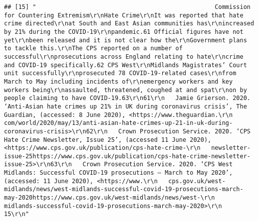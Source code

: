 \documentclass[
]{book}
\begin{document}
\begin{verbatim}
## [15] "                                                  Commission for Countering Extremism\r\nHate Crime\r\nIt was reported that hate crime directed\r\nat South and East Asian communities has\r\nincreased by 21% during the COVID-19\r\npandemic.61 Official figures have not yet\r\nbeen released and it is not clear how the\r\nGovernment plans to tackle this.\r\nThe CPS reported on a number of successful\r\nprosecutions across England relating to hate\r\ncrime and COVID-19 specifically.62 CPS West\r\nMidlands Magistrates’ Court unit successfully\r\nprosecuted 78 COVID-19-related cases\r\nfrom March to May including incidents of\r\nemergency workers and key workers being\r\nassaulted, threatened, coughed at and spat\r\non by people claiming to have COVID-19.63\r\n61\r\n   Jamie Grierson. 2020. ‘Anti-Asian hate crimes up 21% in UK during coronavirus crisis’, The Guardian, (accessed: 8 June 2020), <https://www.theguardian.\r\n   com/world/2020/may/13/anti-asian-hate-crimes-up-21-in-uk-during-coronavirus-crisis>\r\n62\r\n   Crown Prosecution Service. 2020. ‘CPS Hate Crime Newsletter, Issue 25’, (accessed 11 June 2020), <https://www.cps.gov.uk/publication/cps-hate-crime-\r\n   newsletter-issue-25https://www.cps.gov.uk/publication/cps-hate-crime-newsletter-issue-25>\r\n63\r\n   Crown Prosecution Service. 2020. ‘CPS West Midlands: Successful COVID-19 prosecutions – March to May 2020’, (accessed: 11 June 2020), <https://www.\r\n   cps.gov.uk/west-midlands/news/west-midlands-successful-covid-19-prosecutions-march-may-2020https://www.cps.gov.uk/west-midlands/news/west-\r\n   midlands-successful-covid-19-prosecutions-march-may-2020>\r\n                                                                           15\r\n"                                                                                                                                                                                                                                                                                                                                                                                                                                                                                                                                                                                                                                                                                                                                                                                                                                                                                                                                                                                                                                                                                                                                                                                                                                                                                                                                                                                                                                                                                                                                                                                                                                                
\end{verbatim}
\end{document}
